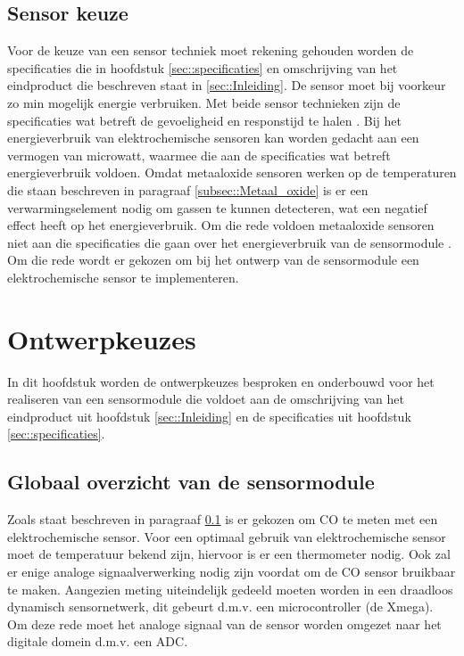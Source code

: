 \documentclass[a4paper, 11pt]{article} %
\begin{document}
	\subsection{Sensor keuze} \label{subsec::Sensor_keuze}
	Voor de keuze van een sensor techniek moet rekening gehouden worden de specificaties die in hoofdstuk \ref{sec::specificaties} en omschrijving van het eindproduct die beschreven staat in \ref{sec::Inleiding}. De sensor moet bij voorkeur zo min mogelijk energie verbruiken. Met beide sensor technieken zijn de specificaties wat betreft de gevoeligheid en responstijd te halen \cite{Sensor keuze}. Bij het energieverbruik van elektrochemische sensoren kan worden gedacht aan een vermogen van microwatt, waarmee die aan de specificaties wat betreft energieverbruik voldoen. Omdat metaaloxide sensoren werken op de temperaturen die staan beschreven in paragraaf \ref{subsec::Metaal_oxide} is er een verwarmingselement nodig om gassen te kunnen detecteren, wat een negatief effect heeft op het energieverbruik. Om die rede voldoen metaaloxide sensoren niet aan die specificaties die gaan over het energieverbruik van de sensormodule \cite{MO sensoren} \cite{Sensor keuze}.\\
	Om die rede wordt er gekozen om bij het ontwerp van de sensormodule een elektrochemische sensor te implementeren.
	
	\section{Ontwerpkeuzes} \label{sec::Ontwerpkeuzes}
	In dit hoofdstuk worden de ontwerpkeuzes besproken en onderbouwd voor het realiseren van een sensormodule die voldoet aan de omschrijving van het eindproduct uit hoofdstuk \ref{sec::Inleiding} en de specificaties uit hoofdstuk \ref{sec::specificaties}.
	
	\subsection{Globaal overzicht van de sensormodule}
	\label{subsec::Globaal_Overzicht}
	Zoals staat beschreven in paragraaf \ref{subsec::Sensor_keuze} is er gekozen om CO te meten met een elektrochemische sensor. Voor een optimaal gebruik van elektrochemische sensor moet de temperatuur bekend zijn, hiervoor is er een thermometer nodig. Ook zal er enige analoge signaalverwerking nodig zijn voordat om de CO sensor bruikbaar te maken. Aangezien meting uiteindelijk gedeeld moeten worden in een draadloos dynamisch sensornetwerk, dit gebeurt d.m.v. een microcontroller (de Xmega). Om deze rede moet het analoge signaal van de sensor worden omgezet naar het digitale domein d.m.v. een ADC.
	\newpage
	\appendix
\end{document}
